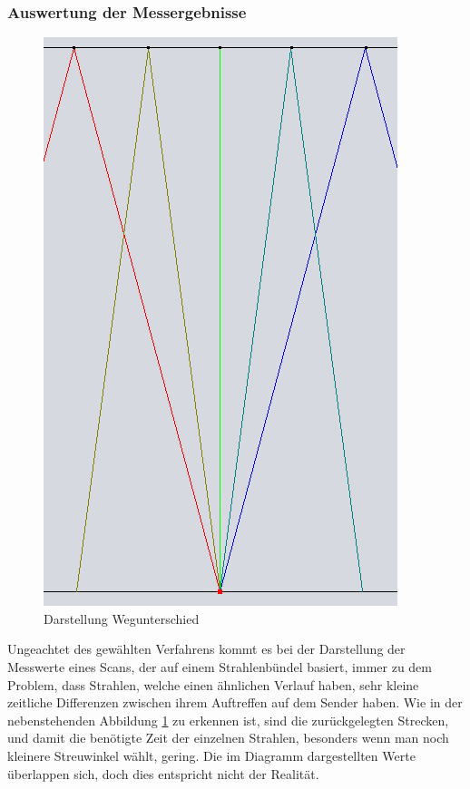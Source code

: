 \documentclass[reducespace,stylepage,semiarbeit]{spezidoc}
\begin{document}
\newpage
\subsubsection{Auswertung der Messergebnisse} %
\begin{figure}
\includegraphics[scale=0.25]{pictures/Strahlenbuendel.png} 
\caption{Darstellung Wegunterschied}
\label{fig:Wegunters}
\end{figure} 
Ungeachtet des gewählten Verfahrens kommt es bei der Darstellung der Messwerte eines Scans, der auf einem Strahlenbündel basiert, immer zu dem Problem, dass Strahlen, welche einen ähnlichen Verlauf haben, sehr kleine zeitliche Differenzen zwischen ihrem Auftreffen auf dem Sender haben. 
Wie in der nebenstehenden Abbildung \ref{fig:Wegunters} zu erkennen ist, sind die zurückgelegten Strecken, und damit die benötigte Zeit der einzelnen Strahlen, besonders wenn man noch kleinere Streuwinkel wählt, gering. 
Die im Diagramm dargestellten Werte überlappen sich, doch dies entspricht nicht der Realität. 
\end{document}
